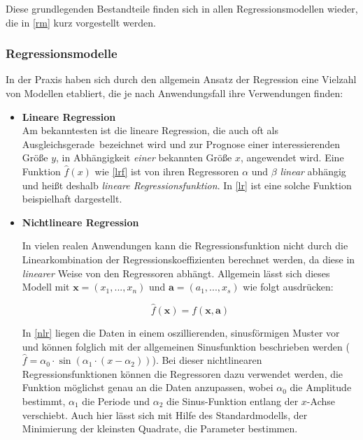 Diese grundlegenden Bestandteile finden sich in allen Regressionsmodellen wieder, die in \vref{rm} kurz vorgestellt werden. 


\subsubsection{Regressionsmodelle}\label{rm}
In der Praxis haben sich durch den allgemein Ansatz der Regression eine Vielzahl von Modellen etabliert, die je nach Anwendungsfall ihre Verwendungen finden:


\begin{itemize}


\item \textbf{Lineare Regression}
\\ Am bekanntesten ist die lineare Regression, die auch oft als \glqq Ausgleichsgerade\grqq~bezeichnet wird und zur Prognose einer interessierenden Größe $y$, in Abhängigkeit \textit{einer} bekannten Größe $x$, angewendet wird. Eine Funktion $\hat{f}(x)$ wie \vref{lrf} ist von ihren Regressoren $\alpha$ und $\beta$ \textit{linear} abhängig und heißt deshalb \textit{lineare Regressionsfunktion}. In \vref{lr} ist eine solche Funktion beispielhaft dargestellt.




\item \textbf{Nichtlineare Regression}

In vielen realen Anwendungen kann die Regressionsfunktion nicht durch die Linearkombination der Regressionskoeffizienten berechnet werden, da diese in \textit{linearer} Weise von den Regressoren abhängt. Allgemein lässt sich dieses Modell mit $\boldsymbol{x} = (x_1,...,x_n)$ und $\boldsymbol{a} = (a_1,...,x_s)$ wie folgt ausdrücken:

\begin{equation}
	\hat{f}(\boldsymbol{x}) = f(\boldsymbol{x},\boldsymbol{a})
\end{equation}

In \vref{nlr} liegen die Daten in einem oszillierenden, sinusförmigen Muster vor und können folglich mit der allgemeinen Sinusfunktion beschrieben werden ($\hat{f} = \alpha_0 \cdot \sin(\alpha_1 \cdot (x-\alpha_2))$). Bei dieser nichtlinearen Regressionsfunktionen können die Regressoren dazu verwendet werden, die Funktion möglichst genau an die Daten anzupassen, wobei $\alpha_0$ die Amplitude bestimmt, $\alpha_1$ die Periode und $\alpha_2$ die Sinus-Funktion entlang der $x$-Achse verschiebt. Auch hier lässt sich mit Hilfe des Standardmodells, der Minimierung der kleinsten Quadrate, die Parameter bestimmen.


\end{itemize}
